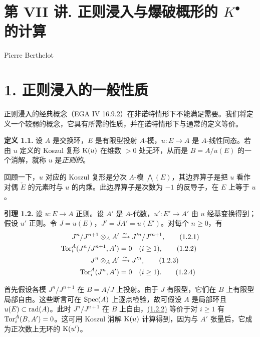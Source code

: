 \section*{第 VII 讲. 正则浸入与爆破概形的 \texorpdfstring{$K^\bullet$}{K} 的计算}
\begin{center}
Pierre Berthelot
\end{center}

\section*{1. 正则浸入的一般性质}

正则浸入的经典概念（EGA IV 16.9.2）在非诺特情形下不能满足需要。我们将定义一个较弱的概念，它具有所需的性质，并在诺特情形下与通常的定义等价。

\textbf{定义 1.1.} 设 \(A\) 是交换环，\(E\) 是有限型投射 \(A\)-模，\(u:E\to A\) 是 \(A\)-线性同态。若由 \(u\) 定义的 Koszul 复形 \(\mathrm K(u)\) 在维数 \(>0\) 处无环，从而是 \(B=A/u(E)\) 的一个消解，就称 \(u\) 是\emph{正则的}。

回顾一下，\(u\) 对应的 Koszul 复形是分次 \(A\)-模 \(\bigwedge(E)\)，其边界算子是把 \(u\) 看作对偶 \(\check E\) 的元素时与 \(u\) 的内乘。此边界算子是次数为 \(-1\) 的反导子，在 \(E\) 上等于 \(u\)。

\textbf{引理 1.2.} 设 \(u:E\to A\) 正则。设 \(A'\) 是 \(A\)-代数，\(u':E'\to A'\) 由 \(u\) 经基变换得到；假设 \(u'\) 正则。令 \(J=u(E)\)，\(J'=JA'=u(E')\)。对每个 \(n\ge0\)，有
\begin{align}
 J^n/J^{n+1}\otimes_AA'&\xrightarrow{\sim}J'^n/J'^{n+1}, \tag{1.2.1}\\
 \operatorname{Tor}_i^A(J^n/J^{n+1},A')&=0\quad(i\ge1), \tag{1.2.2}\\
 J^n\otimes_AA'&\xrightarrow{\sim}J'^n, \tag{1.2.3}\\
 \operatorname{Tor}_i^A(J^n,A')&=0\quad(i\ge1). \tag{1.2.4}
\end{align}

首先假设各模 \(J^n/J^{n+1}\) 在 \(B=A/J\) 上投射。由于 \(J\) 有限型，它们在 \(B\) 上有限型局部自由。这些断言可在 \(\operatorname{Spec}(A)\) 上逐点检验，故可假设 \(A\) 是局部环且 \(u(E)\subset\operatorname{rad}(A)\)。此时 \(J^n/J^{n+1}\) 在 \(B\) 上自由，\hyperlink{sga6.e07.eq.1-2-2}{(1.2.2)} 等价于对 \(i\ge1\) 有 \(\operatorname{Tor}_i^A(B,A')=0\)。这可用 Koszul 消解 \(\mathrm K(u)\) 计算得到，因为与 \(A'\) 张量后，它成为正次数上无环的 \(\mathrm K(u')\)。

